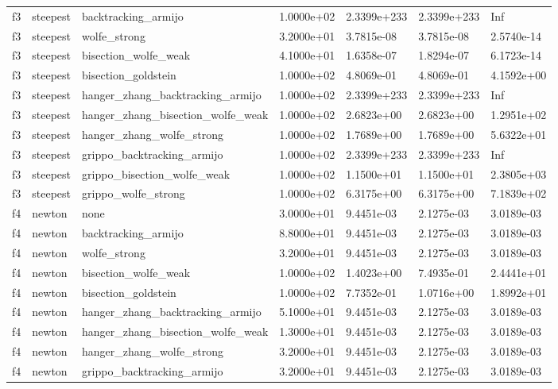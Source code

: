 \documentclass[a4paper,11pt]{article}
\numberwithin{equation}{section} %
\begin{document}
\begin{longtable}{p{1.5cm}|p{1.5cm}|p{4cm}|p{2cm}|p{2cm}|p{2cm}|p{2cm}}
        f3 & steepest & backtracking\_armijo & 1.0000e+02 & 2.3399e+233 & 2.3399e+233 & Inf \\
        f3 & steepest & wolfe\_strong & 3.2000e+01 & 3.7815e-08 & 3.7815e-08 & 2.5740e-14 \\
        f3 & steepest & bisection\_wolfe\_weak & 4.1000e+01 & 1.6358e-07 & 1.8294e-07 & 6.1723e-14 \\
        f3 & steepest & bisection\_goldstein & 1.0000e+02 & 4.8069e-01 & 4.8069e-01 & 4.1592e+00 \\
        f3 & steepest & hanger\_zhang\_backtracking\_armijo & 1.0000e+02 & 2.3399e+233 & 2.3399e+233 & Inf \\
        f3 & steepest & hanger\_zhang\_bisection\_wolfe\_weak & 1.0000e+02 & 2.6823e+00 & 2.6823e+00 & 1.2951e+02 \\
        f3 & steepest & hanger\_zhang\_wolfe\_strong & 1.0000e+02 & 1.7689e+00 & 1.7689e+00 & 5.6322e+01 \\
        f3 & steepest & grippo\_backtracking\_armijo & 1.0000e+02 & 2.3399e+233 & 2.3399e+233 & Inf \\
        f3 & steepest & grippo\_bisection\_wolfe\_weak & 1.0000e+02 & 1.1500e+01 & 1.1500e+01 & 2.3805e+03 \\
        f3 & steepest & grippo\_wolfe\_strong & 1.0000e+02 & 6.3175e+00 & 6.3175e+00 & 7.1839e+02 \\
        f4 & newton & none & 3.0000e+01 & 9.4451e-03 & 2.1275e-03 & 3.0189e-03 \\
        f4 & newton & backtracking\_armijo & 8.8000e+01 & 9.4451e-03 & 2.1275e-03 & 3.0189e-03 \\
        f4 & newton & wolfe\_strong & 3.2000e+01 & 9.4451e-03 & 2.1275e-03 & 3.0189e-03 \\
        f4 & newton & bisection\_wolfe\_weak & 1.0000e+02 & 1.4023e+00 & 7.4935e-01 & 2.4441e+01 \\
        f4 & newton & bisection\_goldstein & 1.0000e+02 & 7.7352e-01 & 1.0716e+00 & 1.8992e+01 \\
        f4 & newton & hanger\_zhang\_backtracking\_armijo & 5.1000e+01 & 9.4451e-03 & 2.1275e-03 & 3.0189e-03 \\
        f4 & newton & hanger\_zhang\_bisection\_wolfe\_weak & 1.3000e+01 & 9.4451e-03 & 2.1275e-03 & 3.0189e-03 \\
        f4 & newton & hanger\_zhang\_wolfe\_strong & 3.2000e+01 & 9.4451e-03 & 2.1275e-03 & 3.0189e-03 \\
        f4 & newton & grippo\_backtracking\_armijo & 3.2000e+01 & 9.4451e-03 & 2.1275e-03 & 3.0189e-03 \\

\end{longtable}
\end{document}
